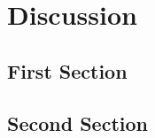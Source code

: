 \chapter{Discussion}
\label{sec:discussion}
\kant[12-13] %
\section{First Section}
\kant[14]    %
\section{Second Section}
\kant[15]    %